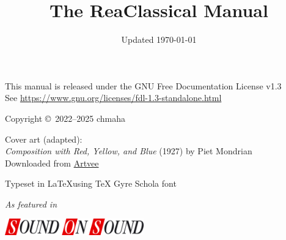 \documentclass[10pt,american]{article}
\begin{document}

\author{}
\title{\textbf{The ReaClassical Manual}}
\date{Updated \today}
\maketitle
\begin{center}
This manual is released under the GNU Free Documentation License v1.3 \\
See
\href{https://www.gnu.org/licenses/fdl-1.3-standalone.html}{https://www.gnu.org/licenses/fdl-1.3-standalone.html}
\par\end{center}

\begin{center}
Copyright \copyright\ 2022--2025 chmaha \par\end{center}

\begin{center}
Cover art (adapted):\emph{}\\
\emph{Composition with Red, Yellow, and Blue} (1927) by Piet Mondrian\\
Downloaded from
\href{https://artvee.com/dl/composition-with-red-yellow-and-blue\#00}{Artvee}
\par\end{center}

\begin{center}
Typeset in \LaTeX using \TeX{} Gyre Schola font \par\end{center}

\vspace*{\fill}
\begin{center}
\begin{minipage}[c]{0.2\columnwidth}%
\begin{flushright}
\emph{As featured in}\thickspace{}\thickspace{} \par\end{flushright}%
\end{minipage}%
\begin{minipage}[c]{0.5\columnwidth}%
\href{https://www.soundonsound.com/techniques/source-destination-editing-reaclassical}{\includegraphics[width=6cm]{user_guide_images/sos.jpg}}%
\end{minipage}
\par\end{center}
\end{document}
